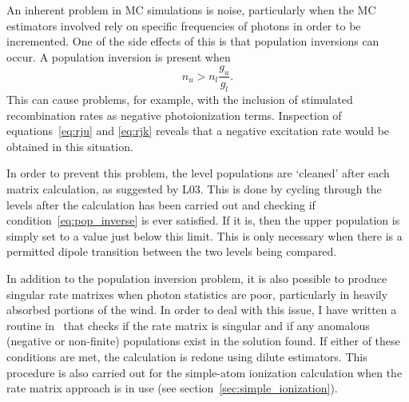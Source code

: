An inherent problem in MC simulations is noise, particularly
when the MC estimators involved rely on specific frequencies of
photons in order to be incremented. One of the side effects
of this is that population inversions can occur. A population
inversion is present when
\begin{equation}
n_u > n_l \frac{g_u}{g_l}.
\label{eq:pop_inverse}
\end{equation}
This can cause problems, for example, with the inclusion
of stimulated recombination rates as negative photoionization
terms. Inspection of equations~\ref{eq:rju} 
and \ref{eq:rjk} reveals that a negative
excitation rate would be obtained in this situation.

In order to prevent this problem, the level populations are `cleaned' 
after each matrix calculation, as suggested by L03. 
This is done by cycling through the levels
after the calculation has been carried out and checking if
condition~\ref{eq:pop_inverse} is ever satisfied. If it is, then
the upper population is simply set to a value just below this limit.
This is only necessary when there is a permitted dipole transition 
between the two levels being compared.

In addition to the population inversion problem, it is also possible to 
produce singular rate matrixes when photon statistics are poor, 
particularly in heavily absorbed portions of the wind. 
In order to deal with this issue, I have written a routine in \py\
that checks if the rate matrix is singular and if any anomalous (negative or
non-finite) populations exist in the solution found. If either of these 
conditions are met, the calculation is redone using dilute estimators.
This procedure is also carried out for the simple-atom ionization
calculation when the rate matrix approach is in use 
(see section~\ref{sec:simple_ionization}).